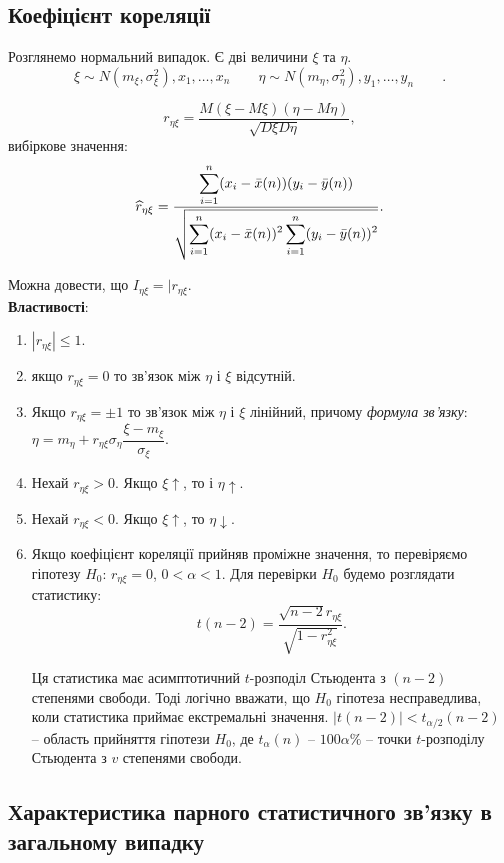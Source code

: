 \subsection{Коефіцієнт кореляції}

Розглянемо нормальний випадок. Є дві величини $\xi$ та $\eta$. \[\xi \sim N(m_\xi, \sigma_\xi^2), x_1, \ldots, x_n \qquad \eta \sim N(m_\eta, \sigma_\eta^2), y_1, \ldots, y_n \qquad. \]

\[ r_{\eta\xi} = \dfrac{M(\xi-M\xi)(\eta-M\eta)}{\sqrt{D\xi D\eta}}, \] вибіркове значення:
\[ \widehat{r}_{\eta\xi} = \dfrac{\displaystyle\sum\limits_{i=1}^n(x_i-\bar{x}(n))(y_i-\bar{y}(n))}{\sqrt{\displaystyle\sum\limits_{i=1}^n(x_i-\bar{x}(n))^2\displaystyle\sum\limits_{i=1}^n(y_i-\bar{y}(n))^2}}. \]

Можна довести, що $I_{\eta\xi}=|r_{\eta\xi}$. \\

\textbf{Властивості}:
\begin{enumerate}
	\item $|r_{\eta\xi}| \le 1$.
	\item якщо $r_{\eta\xi} = 0$ то зв'язок між $\eta$ і $\xi$ відсутній.
	\item Якщо $r_{\eta\xi} = \pm 1$ то зв'язок між $\eta$ і $\xi$ лінійний, причому \textit{формула зв'язку}: $\eta = m_\eta + r_{\eta\xi}\sigma_\eta \dfrac{\xi - m_\xi}{\sigma_\xi}$.
	\item Нехай $r_{\eta\xi} > 0$. Якщо $\xi \uparrow$, то і $\eta \uparrow$.
	\item Нехай $r_{\eta\xi} < 0$. Якщо $\xi \uparrow$, то $\eta \downarrow$.
	\item Якщо коефіцієнт кореляції прийняв проміжне значення, то перевіряємо гіпотезу $H_0$: $r_{\eta\xi} = 0$, $0 < \alpha < 1$. Для перевірки $H_0$ будемо розглядати статистику: \[t(n-2)=\dfrac{\sqrt{n-2}r_{\eta\xi}}{\sqrt{1-r_{\eta\xi}^2}}. \]

	Ця статистика має асимптотичний $t$-розподіл Стьюдента з $(n - 2)$ степенями свободи. Тоді логічно вважати, що $H_0$ гіпотеза несправедлива, коли статистика приймає екстремальні значення. $|t(n-2)| < t_{\alpha/2}(n-2)$ -- область прийняття гіпотези $H_0$, де $t_\alpha(n)$ -- $100\alpha\%$ -- точки $t$-розподілу Стьюдента з $v$ степенями свободи.
\end{enumerate}

\subsection{Характеристика парного статистичного зв'язку в загальному випадку}

